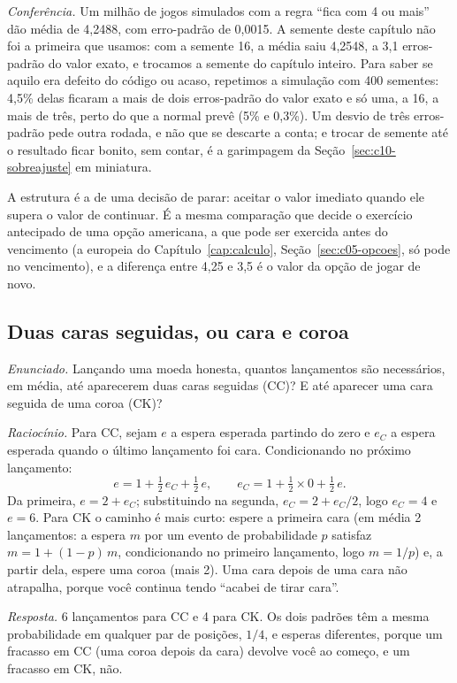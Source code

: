 \emph{Conferência.} Um milhão de jogos simulados com a regra ``fica com 4 ou mais'' dão média de 4,2488, com erro-padrão de 0,0015. A semente deste capítulo não foi a primeira que usamos: com a semente 16, a média saiu 4,2548, a 3,1 erros-padrão do valor exato, e trocamos a semente do capítulo inteiro. Para saber se aquilo era defeito do código ou acaso, repetimos a simulação com 400 sementes: 4,5\% delas ficaram a mais de dois erros-padrão do valor exato e só uma, a 16, a mais de três, perto do que a normal prevê (5\% e 0,3\%). Um desvio de três erros-padrão pede outra rodada, e não que se descarte a conta; e trocar de semente até o resultado ficar bonito, sem contar, é a garimpagem da Seção~\ref{sec:c10-sobreajuste} em miniatura.

A estrutura é a de uma decisão de parar: aceitar o valor imediato quando ele supera o valor de continuar. É a mesma comparação que decide o exercício antecipado de uma opção americana, a que pode ser exercida antes do vencimento (a europeia do Capítulo~\ref{cap:calculo}, Seção~\ref{sec:c05-opcoes}, só pode no vencimento), e a diferença entre 4,25 e 3,5 é o valor da opção de jogar de novo.

\subsection{Duas caras seguidas, ou cara e coroa}

\emph{Enunciado.} Lançando uma moeda honesta, quantos lançamentos são necessários, em média, até aparecerem duas caras seguidas (CC)? E até aparecer uma cara seguida de uma coroa (CK)?

\emph{Raciocínio.} Para CC, sejam $e$ a espera esperada partindo do zero e $e_C$ a espera esperada quando o último lançamento foi cara. Condicionando no próximo lançamento:
\begin{equation*}
  e = 1 + \tfrac{1}{2}\, e_C + \tfrac{1}{2}\, e , \qquad
  e_C = 1 + \tfrac{1}{2} \times 0 + \tfrac{1}{2}\, e .
\end{equation*}
Da primeira, $e = 2 + e_C$; substituindo na segunda, $e_C = 2 + e_C/2$, logo $e_C = 4$ e $e = 6$. Para CK o caminho é mais curto: espere a primeira cara (em média 2 lançamentos: a espera $m$ por um evento de probabilidade $p$ satisfaz $m = 1 + (1-p)\,m$, condicionando no primeiro lançamento, logo $m = 1/p$) e, a partir dela, espere uma coroa (mais 2). Uma cara depois de uma cara não atrapalha, porque você continua tendo ``acabei de tirar cara''.

\emph{Resposta.} 6 lançamentos para CC e 4 para CK. Os dois padrões têm a mesma probabilidade em qualquer par de posições, $1/4$, e esperas diferentes, porque um fracasso em CC (uma coroa depois da cara) devolve você ao começo, e um fracasso em CK, não.

